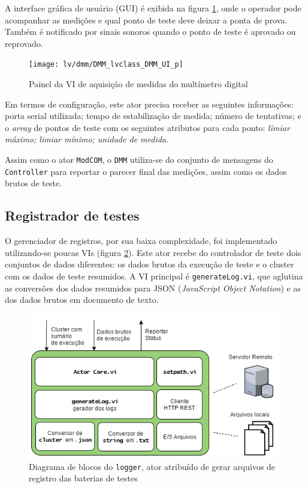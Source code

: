             A interface gráfica de usuário (GUI) é exibida na figura \ref{fig:dmmfp}, onde o operador pode acompanhar as medições e qual ponto de teste deve deixar a ponta de prova. Também é notificado por sinais sonoros quando o ponto de teste é aprovado ou reprovado.
            
            \begin{figure}
                \centering
                \texttt{[image: lv/dmm/DMM\_lvclass\_DMM\_UI\_p]}
                \caption{Painel da VI de aquisição de medidas do multímetro digital}
                \label{fig:dmmfp}
            \end{figure}
            
            Em termos de configuração, este ator precisa receber as seguintes informações: porta serial utilizada; tempo de estabilização de medida; número de tentativas; e o \textit{array} de pontos de teste com os seguintes atributos para cada ponto: \textit{limiar máximo; limiar mínimo; unidade de medida.}
            
            Assim como o ator \texttt{ModCOM}, o \texttt{DMM} utiliza-se do conjunto de mensagens do \texttt{Controller} para reportar o parecer final das medições, assim como os dados brutos de teste. 
            
            
        \subsection{Registrador de testes} 
            
            
            O gerenciador de registros, por sua baixa complexidade, foi implementado utilizando-se poucas VIs (figura \ref{fig:diaglog}). Este ator recebe do controlador de teste dois conjuntos de dados diferentes: os dados brutos da execução de teste e o cluster com os dados de teste resumidos. 
            A VI principal é \texttt{generateLog.vi}, que aglutina as conversões dos dados resumidos para JSON (\textit{JavaScript Object Notation}) e as dos dados brutos em documento de texto. 
            
              \begin{figure}
                \centering
                \includegraphics[width=0.9\linewidth]{fig/diag/diaglog.png}
                \caption{Diagrama de blocos do \texttt{logger}, ator atribuído de gerar arquivos de registro das baterias de testes}
                \label{fig:diaglog}
            \end{figure}
            
